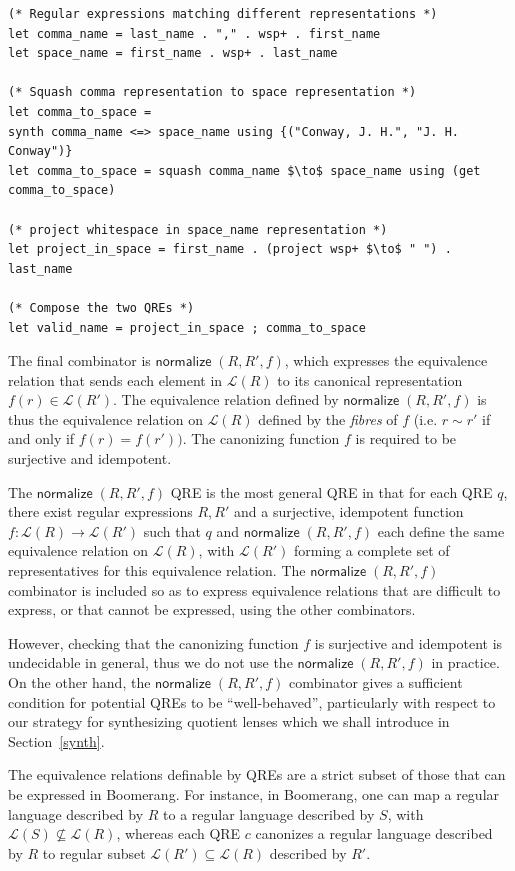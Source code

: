 \documentclass{svproc}
\newcommand{\kw}[1]{\ensuremath{\mathsf{#1}}}
\newcommand{\normalize}[3]{\ensuremath{\kw{normalize} \; (#1, #2, #3)}}
\begin{document}
\begin{lstlisting}
(* Regular expressions matching different representations *)
let comma_name = last_name . "," . wsp+ . first_name
let space_name = first_name . wsp+ . last_name

(* Squash comma representation to space representation *)
let comma_to_space = 
synth comma_name <=> space_name using {("Conway, J. H.", "J. H. Conway")} 
let comma_to_space = squash comma_name $\to$ space_name using (get comma_to_space)

(* project whitespace in space_name representation *)
let project_in_space = first_name . (project wsp+ $\to$ " ") . last_name

(* Compose the two QREs *)
let valid_name = project_in_space ; comma_to_space
\end{lstlisting}

The final combinator is $\normalize{R}{R'}{f}$, which expresses
the equivalence relation that sends each element in $\mathcal{L}(R)$ to its
canonical representation $f(r) \in \mathcal{L}(R')$. The equivalence relation
defined by $\normalize{R}{R'}{f}$ is thus the equivalence relation on
$\mathcal{L}(R)$ defined by the {\em fibres} of $f$ (i.e. $r \sim r'$ if and
only if $f(r) = f(r'))$. The canonizing function $f$ is required to be
surjective and idempotent.

The $\normalize{R}{R'}{f}$ QRE is the most general QRE in that for each QRE
$q$, there exist regular expressions $R, R'$ and a surjective, idempotent
function $f:\mathcal{L}(R) \longrightarrow \mathcal{L}(R')$ such that $q$ and
$\normalize{R}{R'}{f}$ each define the same equivalence relation on
$\mathcal{L}(R)$, with $\mathcal{L}(R')$ forming a complete set of
representatives for this equivalence relation. The $\normalize{R}{R'}{f}$
combinator is included so as to express equivalence relations that are
difficult to express, or that cannot be expressed, using the other
combinators.

However, checking that the canonizing function $f$ is
surjective and idempotent is undecidable in general, thus we do not use the
$\normalize{R}{R'}{f}$ in practice. On the other hand, the
$\normalize{R}{R'}{f}$ combinator gives a sufficient condition for potential
QREs to be ``well-behaved'', particularly with respect to our strategy for
synthesizing quotient lenses which we shall introduce in Section~\ref{synth}.

The equivalence relations definable by QREs are a strict subset of those that
can be expressed in Boomerang. For instance, in Boomerang, one can map a
regular language described by $R$ to a regular language described by $S$, with
$\mathcal{L}(S) \not \subseteq \mathcal{L}(R)$, whereas each QRE $c$ canonizes
a regular language described by $R$ to regular subset $\mathcal{L}(R')
\subseteq \mathcal{L}(R)$ described by $R'$.
\end{document}
